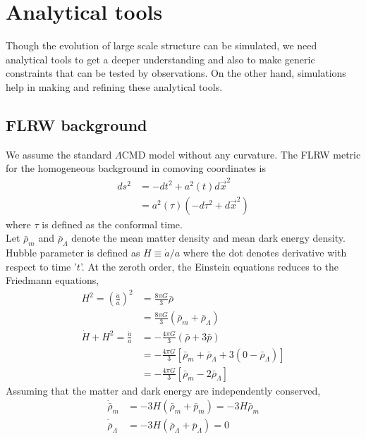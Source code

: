\documentclass[12pt]{article}
\begin{document}
\section{Analytical tools}
Though the evolution of large scale structure can be simulated, we need analytical tools to get a deeper understanding and also to make generic constraints that can be tested by observations. On the other hand, simulations help in making and refining these analytical tools. 

\subsection{FLRW background}
We assume the standard $\Lambda$CMD model without any curvature. The FLRW metric for the homogeneous background in comoving coordinates is
\begin{align}
ds^2 &= -dt^2 + a^2(t) d\vec{x}^2\\
&= a^2(\tau) \left( -d\tau^2 + d\vec{x}^2 \right) 
\end{align}
where $\tau$ is defined as the conformal time.\\
Let $\bar{\rho}_{m}$ and $\bar{\rho}_{\Lambda}$ denote the mean matter density and mean dark energy density. Hubble parameter is defined as $H \equiv \dot{a}/a$ where the dot denotes derivative with respect to time '$t$'. At the zeroth order, the Einstein equations reduces to the Friedmann equations,
\begin{align}
\nonumber
H^2 = \left(\frac{\dot{a}}{a}\right)^2 &= \frac{8 \pi G}{3} \bar{\rho} \\
\label{eq:fried-eqn-1}
&= \frac{8 \pi G}{3} \left( \bar{\rho}_{m} + \bar{\rho}_{\Lambda} \right) \\
\nonumber
\dot{H} + H^2 = \frac{\ddot{a}}{a} &= - \frac{4\pi G}{3} \left(\bar{\rho} + 3\bar{p} \right)\\
\nonumber
&= - \frac{4\pi G}{3} \left[ \bar{\rho}_{m} + \bar{\rho}_{\Lambda} + 3 (0 -\bar{\rho}_{\Lambda}) \right]\\
\label{eq:fried-eqn-2}
&= - \frac{4\pi G}{3} \left[ \bar{\rho}_{m} - 2 \bar{\rho}_{\Lambda} \right] 
\end{align}
%
Assuming that the matter and dark energy are independently conserved,
\begin{align}
\dot{\bar{\rho}}_{m} &= -3 H \left(\bar{\rho}_{m} + {\bar{p}_{m}}\right) = - 3 H \bar{\rho}_{m} \\
\dot{\bar{\rho}}_{\Lambda} &= -3 H \left(\bar{\rho}_{\Lambda} + \bar{p}_{\Lambda} \right) = 0
\end{align}
\end{document}

